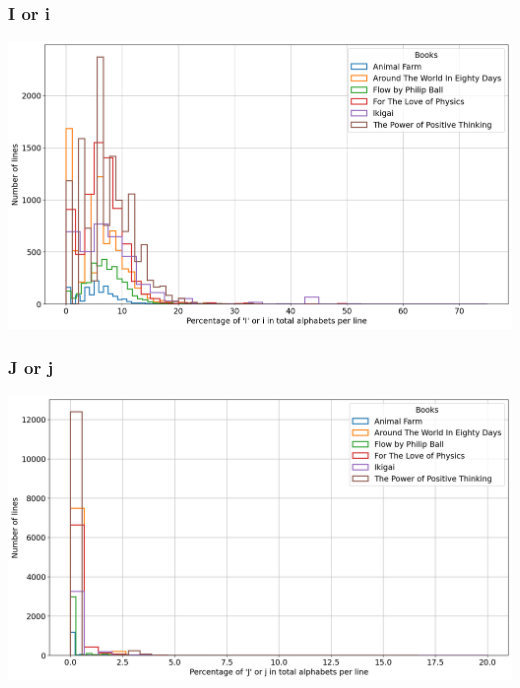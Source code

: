 \begin{frame}
    \frametitle{I or i}
    \begin{center}
        \hspace*{-5ex}
        \includegraphics[scale=0.35]{../01_programFiles/histograms/i.png}\hspace{10ex}
    \end{center}
\end{frame}

\begin{frame}
    \frametitle{J or j}
    \begin{center}
        \hspace*{-5ex}
        \includegraphics[scale=0.35]{../01_programFiles/histograms/j.png}\hspace{10ex}
    \end{center}
\end{frame}

